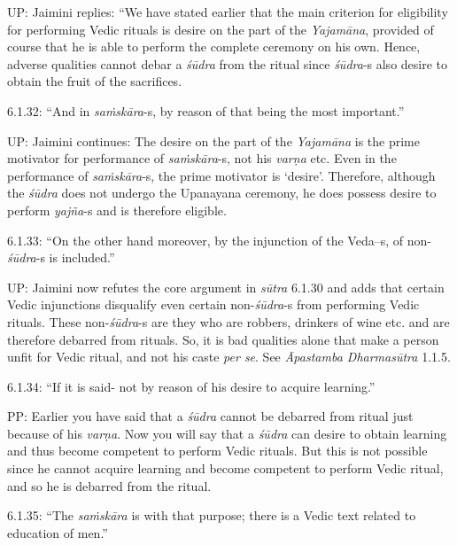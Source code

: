 UP: Jaimini replies: ``We have stated earlier that the main criterion for eligibility for performing Vedic rituals is desire on the part of the \textit{Yajamāna}, provided of course that he is able to perform the complete ceremony on his own. Hence, adverse qualities cannot debar a \textit{śūdra} from the ritual since \textit{śūdra}-s also desire to obtain the fruit of the sacrifices.

6.1.32: “And in \textit{saṁskāra}-s, by reason of that being the most important.”

\newpage

UP: Jaimini continues: The desire on the part of the \textit{Yajamāna} is the prime motivator for performance of \textit{saṁskāra}-s, not his \textit{varṇa }etc. Even in the performance of \textit{saṁskāra}-s, the prime motivator is ‘desire’. Therefore, although the \textit{śūdra} does not undergo the Upanayana ceremony, he does possess desire to perform \textit{yajña}-s and is therefore eligible.

6.1.33: “On the other hand moreover, by the injunction of the Veda--s, of non-\textit{śūdra}-s is included.”

UP: Jaimini now refutes the core argument in \textit{sūtra} 6.1.30 and adds that certain Vedic injunctions disqualify even certain non-\textit{śūdra}-s from performing Vedic rituals. These non-\textit{śūdra}-s are they who are robbers, drinkers of wine etc. and are therefore debarred from rituals. So, it is bad qualities alone that make a person unfit for Vedic ritual, and not his caste \textit{per se}. See \textit{Āpastamba Dharmasūtra} 1.1.5.

6.1.34: “If it is said- not by reason of his desire to acquire learning.”

PP: Earlier you have said that a \textit{śūdra} cannot be debarred from ritual just because of his \textit{varṇa}. Now you will say that a \textit{śūdra} can desire to obtain learning and thus become competent to perform Vedic rituals. But this is not possible since he cannot acquire learning and become competent to perform Vedic ritual, and so he is debarred from the ritual.

6.1.35: “The \textit{saṁskāra} is with that purpose; there is a Vedic text related to education of men.”

